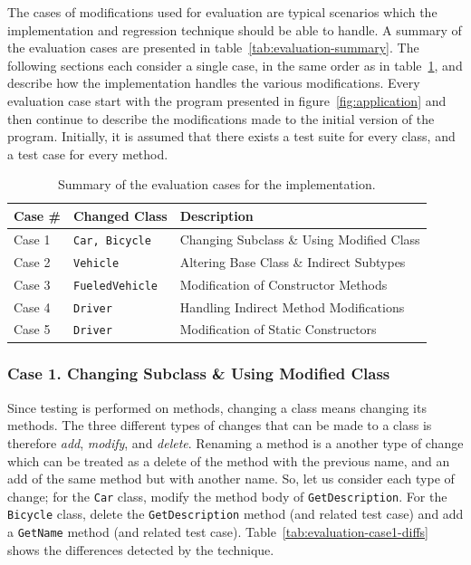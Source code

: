 \documentclass[a4paper,english,12pt]{report}
\newcommand{\textcf}{\texttt}
\begin{document}
The cases of modifications used for evaluation are typical scenarios which the implementation and regression technique should be able to handle. A summary of the evaluation cases are presented in table~\vref{tab:evaluation-summary}. The following sections each consider a single case, in the same order as in table~\ref{tab:evaluation-summary}, and describe how the implementation handles the various modifications. Every evaluation case start with the program presented in figure~\ref{fig:application} and then continue to describe the modifications made to the initial version of the program. Initially, it is assumed that there exists a test suite for every class, and a test case for every method.

\begin{table}[htbp]
  \centering
  \begin{tabular}{|l|l|l|}
    \hline
    \textbf{Case \#} & \textbf{Changed Class} & \textbf{Description}\\
    \hline
    Case 1 & \textcf{Car, Bicycle} & Changing Subclass \& Using Modified Class\\
    \hline
    Case 2 & \textcf{Vehicle} & Altering Base Class \& Indirect Subtypes\\
    \hline
    Case 3 & \textcf{FueledVehicle} & Modification of Constructor Methods\\
    \hline
    Case 4 & \textcf{Driver} & Handling Indirect Method Modifications\\
    \hline
    Case 5 & \textcf{Driver} & Modification of Static Constructors\\
    \hline
  \end{tabular}
  \caption{Summary of the evaluation cases for the implementation.}
  \label{tab:evaluation-summary}
\end{table}

\subsubsection{Case 1. Changing Subclass \& Using Modified Class}
Since testing is performed on methods, changing a class means changing its methods. The three different types of changes that can be made to a class is therefore \textit{add}, \textit{modify}, and \textit{delete}. Renaming a method is a another type of change which can be treated as a delete of the method with the previous name, and an add of the same method but with another name. So, let us consider each type of change; for the \textcf{Car} class, modify the method body of \textcf{GetDescription}. For the \textcf{Bicycle} class, delete the \textcf{GetDescription} method (and related test case) and add a \textcf{GetName} method (and related test case). Table~\vref{tab:evaluation-case1-diffs} shows the differences detected by the technique.
\end{document}
